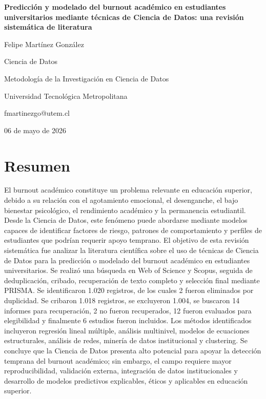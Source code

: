 \documentclass[12pt,a4paper]{article}
\begin{document}
\begin{titlepage}
\thispagestyle{fancy}
\centering
\vspace*{3cm}
{\bfseries\Large Predicción y modelado del burnout académico en estudiantes universitarios mediante técnicas de Ciencia de Datos: una revisión sistemática de literatura\par}
\vspace{2cm}
Felipe Martínez González\par
Ciencia de Datos\par
Metodología de la Investigación en Ciencia de Datos\par
Universidad Tecnológica Metropolitana\par
fmartinezgo@utem.cl\par
\vspace{2cm}
06 de mayo de 2026\par
\end{titlepage}

\section*{Resumen}
El burnout académico constituye un problema relevante en educación superior, debido a su relación con el agotamiento emocional, el desenganche, el bajo bienestar psicológico, el rendimiento académico y la permanencia estudiantil. Desde la Ciencia de Datos, este fenómeno puede abordarse mediante modelos capaces de identificar factores de riesgo, patrones de comportamiento y perfiles de estudiantes que podrían requerir apoyo temprano. El objetivo de esta revisión sistemática fue analizar la literatura científica sobre el uso de técnicas de Ciencia de Datos para la predicción o modelado del burnout académico en estudiantes universitarios. Se realizó una búsqueda en Web of Science y Scopus, seguida de deduplicación, cribado, recuperación de texto completo y selección final mediante PRISMA. Se identificaron 1.020 registros, de los cuales 2 fueron eliminados por duplicidad. Se cribaron 1.018 registros, se excluyeron 1.004, se buscaron 14 informes para recuperación, 2 no fueron recuperados, 12 fueron evaluados para elegibilidad y finalmente 6 estudios fueron incluidos. Los métodos identificados incluyeron regresión lineal múltiple, análisis multinivel, modelos de ecuaciones estructurales, análisis de redes, minería de datos institucional y clustering. Se concluye que la Ciencia de Datos presenta alto potencial para apoyar la detección temprana del burnout académico; sin embargo, el campo requiere mayor reproducibilidad, validación externa, integración de datos institucionales y desarrollo de modelos predictivos explicables, éticos y aplicables en educación superior.
\end{document}
